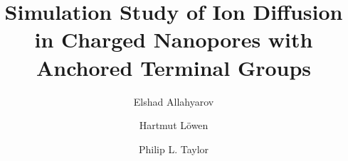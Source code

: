 \documentclass[3p,english,preprint]{elsarticle}
\begin{document}
\begin{frontmatter}




\title{Simulation Study of Ion Diffusion in Charged Nanopores with Anchored Terminal Groups}


\author[1,2,3]{Elshad Allahyarov}

\author[1]{ Hartmut L{\"o}wen}


\author[4]{  Philip L. Taylor}

\address[1]{Institut f\"ur Theoretische Physik II: Weiche Materie, 
Heinrich-Heine Universit\"at  D\"usseldorf,  
  Universit\"atstrasse 1, 40225 D\"usseldorf, Germany}     
\address[2]{ Department of Macromolecular Science and Engineering, Case Western Reserve   
University, Cleveland, Ohio 44106-7202, United States}
\address[3]{Theoretical Department, Joint Institute for High Temperatures, Russian Academy of  
Sciences (IVTAN), 13/19 Izhorskaya street, Moscow 125412, Russia}
\address[4]{ Department of Physics, Case Western Reserve University,
  Cleveland, Ohio 44106-7079, United States}











\end{frontmatter}
\end{document}

